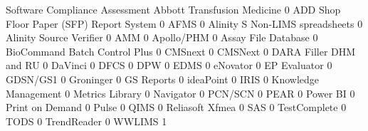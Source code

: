 \documentclass{article}
\begin{document}
\begin{Schunk}
\begin{Soutput}
                                           Software Compliance Assessment
  Abbott Transfusion Medicine                                           0
  ADD Shop Floor Paper (SFP) Report System                              0
  AFMS                                                                  0
  Alinity S Non-LIMS spreadsheets                                       0
  Alinity Source Verifier                                               0
  AMM                                                                   0
  Apollo/PHM                                                            0
  Assay File Database                                                   0
  BioCommand Batch Control Plus                                         0
  CMSnext                                                               0
  CMSNext                                                               0
  DARA Filler DHM and RU                                                0
  DaVinci                                                               0
  DFCS                                                                  0
  DPW                                                                   0
  EDMS                                                                  0
  eNovator                                                              0
  EP Evaluator                                                          0
  GDSN/GS1                                                              0
  Groninger                                                             0
  GS Reports                                                            0
  ideaPoint                                                             0
  IRIS                                                                  0
  Knowledge Management                                                  0
  Metrics Library                                                       0
  Navigator                                                             0
  PCN/SCN                                                               0
  PEAR                                                                  0
  Power BI                                                              0
  Print on Demand                                                       0
  Pulse                                                                 0
  QIMS                                                                  0
  Reliasoft Xfmea                                                       0
  SAS                                                                   0
  TestComplete                                                          0
  TODS                                                                  0
  TrendReader                                                           0
  WWLIMS                                                                1


\end{Soutput}
\end{Schunk}
\end{document}
